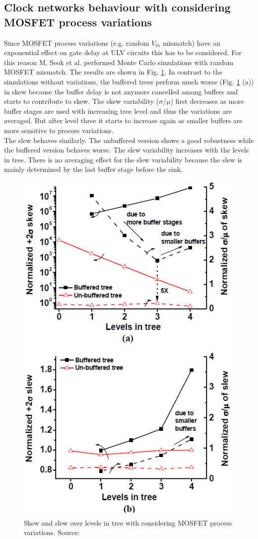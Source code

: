 \documentclass[conference]{IEEEtran}
\begin{document}
\subsection{Clock networks behaviour with considering MOSFET process variations}
Since MOSFET process variations (e.g. random $V_{th}$ mismatch) have an exponential effect on gate delay at ULV circuits \cite{b8} this has to be considered. For this reason M. Seok et al. \cite{b1} performed Monte Carlo simulations with random MOSFET mismatch. The results are shown in Fig. \ref{fig:skew_slew_variations}. In contrast to the simulations without variations, the buffered trees perform much worse (Fig. \ref{fig:skew_slew_variations} (a)) in skew because the buffer delay is not anymore cancelled among buffers and starts to contribute to skew. The skew variability ($\sigma /\mu$) first decreases as more buffer stages are used with increasing tree level and thus the variations are averaged. But after level three it starts to increase again as smaller buffers are more sensitive to process variations.\\
The slew behaves similarly. The unbuffered version shows a good robustness while the buffered version behaves worse. The slew variability increases with the levels in tree. There is no averaging effect for the slew variability because the slew is mainly determined by the last buffer stage before the sink.

\begin{figure}[htbp]
	\includegraphics[width=0.8\linewidth]{img/skew_slew_variations.png}
	\centering
	\caption{Skew and slew over levels in tree with considering MOSFET process variations. Source: \cite{b1}}
	\label{fig:skew_slew_variations}
\end{figure}
\end{document}
